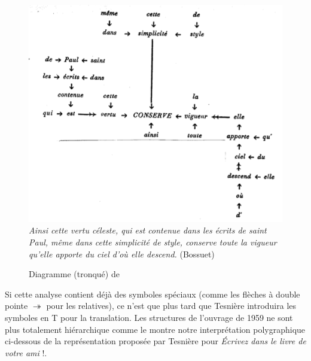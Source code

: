 {    \begin{figure}[H]
    \caption{Diagramme (tronqué) de \citet{tesniere1934comment}}
    \includegraphics[width=\textwidth]{figures/vol1syntaxe2-img017.png}\medskip\\
   \small\textit{Ainsi cette vertu céleste, qui est contenue dans les écrits de saint Paul, même dans cette simplicité de style, conserve toute la vigueur qu’elle apporte du ciel d’où elle descend.} (Bossuet)
    \end{figure}

    Si cette analyse contient déjà des symboles spéciaux (comme les flèches à double pointe \textrm{$\twoheadrightarrow $} pour les relatives), ce n’est que plus tard que Tesnière introduira les symboles en T pour la translation. Les structures de l’ouvrage de 1959 ne sont plus totalement hiérarchique comme le montre notre interprétation polygraphique ci-dessous de la représentation proposée par Tesnière pour \textit{Écrivez dans le livre de votre ami} !.

    \begin{figure}[H]
    \caption{Interprétation polygraphique d'un stemma}
    \begin{subfigure}[b]{.5\textwidth}\centering
\end{subfigure}
\end{figure}}
